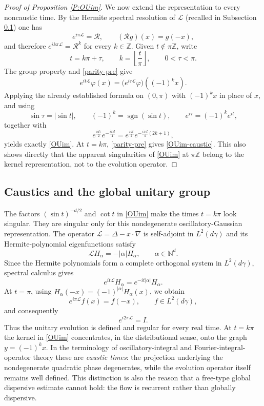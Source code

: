 \documentclass[11pt,a4paper]{amsart}
\def \vf{\varphi}
\numberwithin{equation}{section}
\numberwithin{equation}{section}
\begin{document}
\begin{proof}[Proof of Proposition \ref{P:OUim}]
We now extend the representation to every noncaustic time. By the Hermite spectral resolution of $\mathscr L$ (recalled in Subsection \ref{S:caustics}) one has
\begin{equation}\label{parity-pre}
e^{i\pi\mathscr L}=\mathcal R,\qquad (\mathcal R g)(x)=g(-x),
\end{equation}
and therefore $e^{ik\pi\mathscr L}=\mathcal R^k$ for every $k\in\mathbb Z$. Given $t\notin\pi\mathbb Z$, write
\[
t=k\pi+\tau,\qquad k=\left\lfloor\frac{t}{\pi}\right\rfloor,
\qquad 0<\tau<\pi.
\]
The group property and \eqref{parity-pre} give
\[
e^{it\mathscr L}\vf(x)
=\big(e^{i\tau\mathscr L}\vf\big)((-1)^k x).
\]
Applying the already established formula on $(0,\pi)$ with $(-1)^kx$ in place of $x$, and using
\[
\sin\tau=|\sin t|,\qquad (-1)^k=\operatorname{sgn}(\sin t),
\qquad e^{i\tau}=(-1)^k e^{it},
\]
together with
\[
e^{\frac{id\tau}{2}}e^{-\frac{i\pi d}{4}}
=e^{\frac{idt}{2}}e^{-\frac{i\pi d}{4}(2k+1)},
\]
yields exactly \eqref{OUim}. At $t=k\pi$, \eqref{parity-pre} gives \eqref{OUim-caustic}. This also shows directly that the apparent singularities of \eqref{OUim} at $\pi\mathbb Z$ belong to the kernel representation, not to the evolution operator.

\end{proof}

\subsection{Caustics and the global unitary group}\label{S:caustics}

The factors $(\sin t)^{-d/2}$ and $\cot t$ in \eqref{OUim} make the times $t=k\pi$ look singular.  They are singular only for this nondegenerate oscillatory-Gaussian representation.  The operator $\mathscr L=\Delta-x\cdot\nabla$ is self-adjoint in $L^2(d\gamma)$ and its Hermite-polynomial eigenfunctions satisfy
\[
\mathscr L H_\alpha=-|\alpha|H_\alpha,\qquad \alpha\in\mathbb N^d.
\]
Since the Hermite polynomials form a complete orthogonal system in $L^2(d\gamma)$, spectral calculus gives
\[
e^{it\mathscr L}H_\alpha=e^{-it|\alpha|}H_\alpha.
\]
At $t=\pi$, using $H_\alpha(-x)=(-1)^{|\alpha|}H_\alpha(x)$, we obtain
\begin{equation}\label{parity}
e^{i\pi\mathscr L}f(x)=f(-x),\qquad f\in L^2(d\gamma),
\end{equation}
and consequently
\begin{equation}\label{periodicity}
e^{i2\pi\mathscr L}=I.
\end{equation}
Thus the unitary evolution is defined and regular for every real time.  At $t=k\pi$ the kernel in \eqref{OUim} concentrates, in the distributional sense, onto the graph $y=(-1)^kx$.  In the terminology of oscillatory-integral and Fourier-integral-operator theory these are \emph{caustic times}: the projection underlying the nondegenerate quadratic phase degenerates, while the evolution operator itself remains well defined.  This distinction is also the reason that a free-type global dispersive estimate cannot hold: the flow is recurrent rather than globally dispersive.
\end{document}
